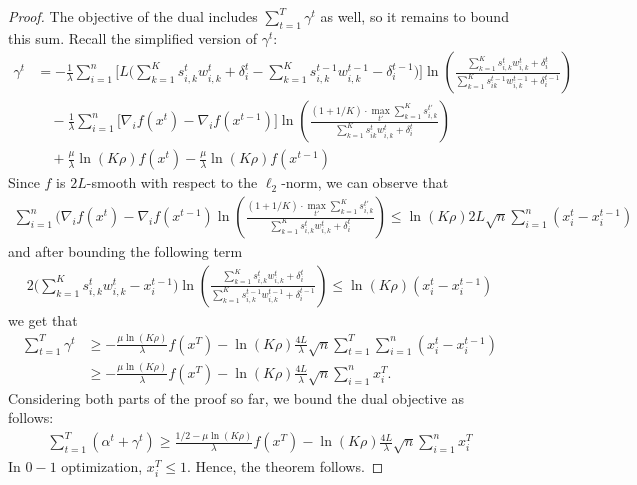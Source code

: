 \begin{proof}
\noindent The objective of the dual includes $\sum_{t = 1}^{T} \gamma^{t}$ as well, so it remains to bound this sum. Recall the simplified version of $\gamma^t$:
\begin{align*}
    \gamma^{t} &= -  \frac{1}{\lambda} \sum_{i=1}^{n} \biggl[  L\biggl( \sum_{k=1}^{K} s_{i,k}^{t} w_{i,k}^{t} + \delta_{i}^{t} - \sum_{k=1}^{K} s_{i,k}^{t-1} w_{i,k}^{t-1} - \delta_{i}^{t-1} \biggr) \biggr]  \ln \left( \frac{\sum_{k=1}^{K} s_{i,k}^{t} w_{i,k}^{t} + \delta_{i}^{t}}{\sum_{k=1}^{K}  s_{ik}^{t-1}w_{i,k}^{t-1}  + \delta_{i}^{t-1}} \right) \\
    	& \quad - \frac{1}{\lambda} \sum_{i=1}^{n} \biggl[ \nabla_{i} f(x^{t}) - \nabla_{i} f(x^{t-1}) \biggr] \ln \left( \frac{(1 + 1/K) \cdot \max_{t'} \sum_{k=1}^{K} s_{i,k}^{t'}}{\sum_{k=1}^{K}  s_{ik}^{t}w_{i,k}^{t}  + \delta_{i}^{t}} \right)  \\
	& \quad + \frac{\mu}{\lambda} \ln(K\rho) f(x^{t}) - \frac{\mu}{\lambda} \ln(K\rho) f(x^{t-1})
\end{align*}
%
Since $f$ is $2L$-smooth with respect to the $\ell_{2}$-norm, we can observe that
\begin{align*}
\sum_{i=1}^{n} (\nabla_{i} f(x^{t}) -  \nabla_{i} f(x^{t-1}) \ln \left( \frac{(1 + 1/K) \cdot \max_{t'} \sum_{k=1}^{K} s_{i,k}^{t'}}{\sum_{k=1}^{K}  s_{i,k}^{t}w_{i,k}^{t}  + \delta_{i}^{t}} \right)
\leq \ln(K\rho) 2L\sqrt{n} \sum_{i=1}^{n} (x_{i}^{t} - x_{i}^{t-1})
\end{align*}
%
and after bounding the following term
%
\begin{align*}
2\biggl( \sum_{k=1}^{K} s_{i,k}^{t} w_{i,k}^{t}  - x_{i}^{t-1} \biggr) \ln \left( \frac{\sum_{k=1}^{K} s_{i,k}^{t} w_{i,k}^{t} + \delta_{i}^{t}}{\sum_{k=1}^{K}  s_{i,k}^{t-1}w_{i,k}^{t-1}  + \delta_{i}^{t-1}} \right)
\leq \ln(K\rho) (x_{i}^{t} - x_{i}^{t-1})
\end{align*}
%
we get that
\begin{align*}
\sum_{t=1}^{T} \gamma^{t} &\geq - \frac{\mu \ln (K\rho)}{\lambda} f(x^{T}) - \ln(K\rho) \frac{4L}{\lambda} \sqrt{n} \sum_{t=1}^{T} \sum_{i=1}^{n} (x_{i}^{t} - x_{i}^{t-1}) \\
&\geq - \frac{\mu \ln (K\rho)}{\lambda} f(x^{T}) - \ln(K\rho) \frac{4L}{\lambda} \sqrt{n} \sum_{i=1}^{n} x_{i}^{T}.
\end{align*}
Considering both parts of the proof so far, we bound the dual objective as follows:
\begin{align*}
\sum_{t=1}^{T} (\alpha^{t} + \gamma^{t}) \geq \frac{1/2-\mu\ln (K\rho)}{\lambda} f(x^{T}) - \ln(K\rho) \frac{4L}{\lambda} \sqrt{n} \sum_{i=1}^{n} x_{i}^{T}
\end{align*}
In $0-1$ optimization, $x_{i}^{T} \leq 1$.
Hence, the theorem follows.
\end{proof}
